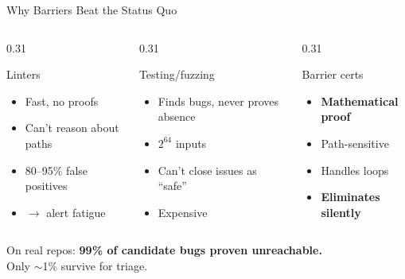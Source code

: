 \documentclass[aspectratio=169]{beamer}
\begin{document}
\begin{frame}{Why Barriers Beat the Status Quo}
\begin{columns}[T]
\begin{column}{0.31\textwidth}
\begin{block}{\textcolor{unsafe}{Linters}}
\begin{itemize}
  \item Fast, no proofs
  \item Can't reason about paths
  \item 80--95\% false positives
  \item $\to$ alert fatigue
\end{itemize}
\end{block}
\end{column}
\begin{column}{0.31\textwidth}
\begin{block}{\textcolor{warn}{Testing/fuzzing}}
\begin{itemize}
  \item Finds bugs, never proves absence
  \item $2^{64}$ inputs
  \item Can't close issues as ``safe''
  \item Expensive
\end{itemize}
\end{block}
\end{column}
\begin{column}{0.31\textwidth}
\begin{block}{\textcolor{safe}{Barrier certs}}
\begin{itemize}
  \item \textbf{Mathematical proof}
  \item Path-sensitive
  \item Handles loops
  \item \textbf{Eliminates silently}
\end{itemize}
\end{block}
\end{column}
\end{columns}

\vspace{0.8em}
\centering
On real repos: \textbf{99\% of candidate bugs proven unreachable.}\\
Only $\sim$1\% survive for triage.
\end{frame}
\end{document}
